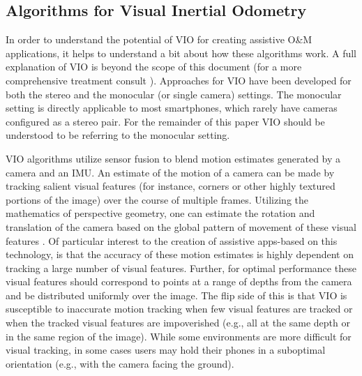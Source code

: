 \documentclass[chi_draft]{sigchi}
\newcommand{\OM}{O\&M\xspace}
\begin{document}
\subsection{Algorithms for Visual Inertial Odometry}
In order to understand the potential of VIO for creating assistive \OM applications, it helps to understand a bit about how these algorithms work.  A full explanation of VIO is beyond the scope of this document (for a more comprehensive treatment consult \cite{gui2015review}).  Approaches for VIO have been developed for both the stereo and the monocular (or single camera) settings.  The monocular setting is directly applicable to most smartphones, which rarely have cameras configured as a stereo pair.  For the remainder of this paper VIO should be understood to be referring to the monocular setting.

VIO algorithms utilize sensor fusion to blend motion estimates generated by a camera and an IMU.  An estimate of the motion of a camera can be made by tracking salient visual features (for instance, corners or other highly textured portions of the image) over the course of multiple frames.  Utilizing the mathematics of perspective geometry, one can estimate the rotation and translation of the camera based on the global pattern of movement of these visual features \cite{Hartley2004}.  Of particular interest to the creation of assistive apps-based on this technology, is that the accuracy of these motion estimates is highly dependent on tracking a large number of visual features.  Further, for optimal performance these visual features should correspond to points at a range of depths from the camera and be distributed uniformly over the image.  The flip side of this is that VIO is susceptible to inaccurate motion tracking when few visual features are tracked or when the tracked visual features are impoverished (e.g., all at the same depth or in the same region of the image).  While some environments are more difficult for visual tracking, in some cases users may hold their phones in a suboptimal orientation (e.g., with the camera facing the ground).
\end{document}
